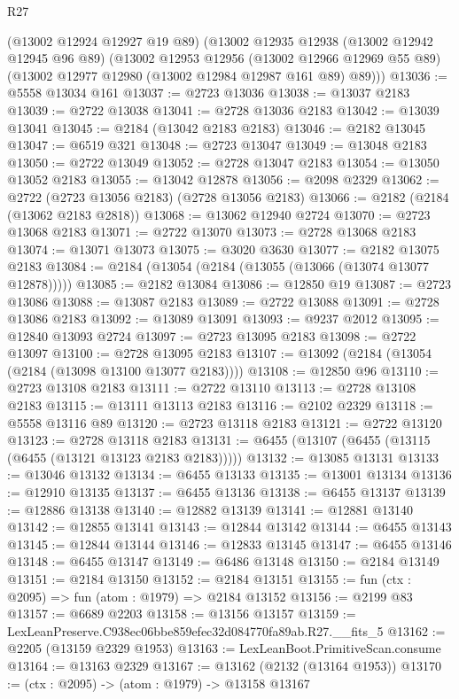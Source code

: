 \begin{lexlean}{R27}
\begin{coremodule}
    (@13002 @12924 @12927 @19 @89)
    (@13002
      @12935
      @12938
      (@13002 @12942 @12945 @96 @89)
      (@13002
        @12953
        @12956
        (@13002 @12966 @12969 @55 @89)
        (@13002 @12977 @12980 (@13002 @12984 @12987 @161 @89) @89)))
@13036 := @5558 @13034 @161
@13037 := @2723 @13036
@13038 := @13037 @2183
@13039 := @2722 @13038
@13041 := @2728 @13036 @2183
@13042 := @13039 @13041
@13045 := @2184 (@13042 @2183 @2183)
@13046 := @2182 @13045
@13047 := @6519 @321
@13048 := @2723 @13047
@13049 := @13048 @2183
@13050 := @2722 @13049
@13052 := @2728 @13047 @2183
@13054 := @13050 @13052 @2183
@13055 := @13042 @12878
@13056 := @2098 @2329
@13062 := @2722 (@2723 @13056 @2183) (@2728 @13056 @2183)
@13066 := @2182 (@2184 (@13062 @2183 @2818))
@13068 := @13062 @12940 @2724
@13070 := @2723 @13068 @2183
@13071 := @2722 @13070
@13073 := @2728 @13068 @2183
@13074 := @13071 @13073
@13075 := @3020 @3630
@13077 := @2182 @13075 @2183
@13084 := @2184 (@13054 (@2184 (@13055 (@13066 (@13074 @13077 @12878)))))
@13085 := @2182 @13084
@13086 := @12850 @19
@13087 := @2723 @13086
@13088 := @13087 @2183
@13089 := @2722 @13088
@13091 := @2728 @13086 @2183
@13092 := @13089 @13091
@13093 := @9237 @2012
@13095 := @12840 @13093 @2724
@13097 := @2723 @13095 @2183
@13098 := @2722 @13097
@13100 := @2728 @13095 @2183
@13107 := @13092 (@2184 (@13054 (@2184 (@13098 @13100 @13077 @2183))))
@13108 := @12850 @96
@13110 := @2723 @13108 @2183
@13111 := @2722 @13110
@13113 := @2728 @13108 @2183
@13115 := @13111 @13113 @2183
@13116 := @2102 @2329
@13118 := @5558 @13116 @89
@13120 := @2723 @13118 @2183
@13121 := @2722 @13120
@13123 := @2728 @13118 @2183
@13131 := @6455 (@13107 (@6455 (@13115 (@6455 (@13121 @13123 @2183 @2183)))))
@13132 := @13085 @13131
@13133 := @13046 @13132
@13134 := @6455 @13133
@13135 := @13001 @13134
@13136 := @12910 @13135
@13137 := @6455 @13136
@13138 := @6455 @13137
@13139 := @12886 @13138
@13140 := @12882 @13139
@13141 := @12881 @13140
@13142 := @12855 @13141
@13143 := @12844 @13142
@13144 := @6455 @13143
@13145 := @12844 @13144
@13146 := @12833 @13145
@13147 := @6455 @13146
@13148 := @6455 @13147
@13149 := @6486 @13148
@13150 := @2184 @13149
@13151 := @2184 @13150
@13152 := @2184 @13151
@13155 := fun (ctx : @2095) => fun (atom : @1979) => @2184 @13152
@13156 := @2199 @83
@13157 := @6689 @2203
@13158 := @13156 @13157
@13159 := LexLeanPreserve.C938ec06bbe859efec32d084770fa89ab.R27.__fits_5
@13162 := @2205 (@13159 @2329 @1953)
@13163 := LexLeanBoot.PrimitiveScan.consume
@13164 := @13163 @2329
@13167 := @13162 (@2132 (@13164 @1953))
@13170 := (ctx : @2095) -> (atom : @1979) -> @13158 @13167

\end{coremodule}
\end{lexlean}
